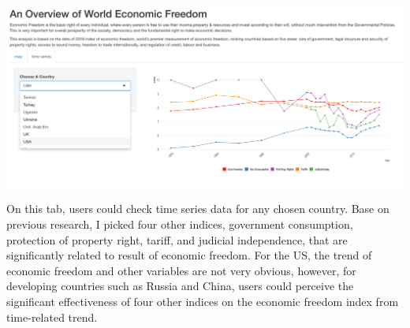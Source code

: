 \documentclass[11pt,letterpaper]{article}
\begin{document}
\includegraphics[width=6.5in]{hw3-2.png} 

\noindent On this tab, users could check time series data for any chosen country. Base on previous research, I picked four other indices, government consumption, protection of property right, tariff, and judicial independence, that are significantly related to result of economic freedom. For the US, the trend of economic freedom and other variables are not very obvious, however, for developing countries such as Russia and China, users could perceive the significant effectiveness of four other indices on the economic freedom index from time-related trend. 
 
 
 
\end{document}
